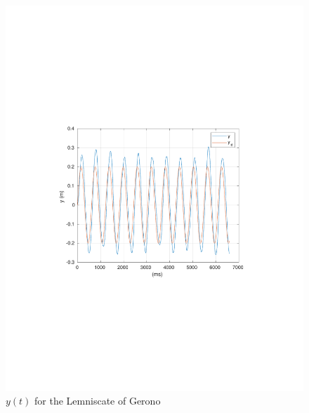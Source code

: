 \begin{frame} 
 \begin{figure}[!htb]
 	\centering
 	\includegraphics[scale=0.7,trim={3.5cm 8cm 4cm 8cm},clip]{figuras/CROB_Fuzzy_Gerono/y.pdf}
 	\caption{$y(t)$ for the Lemniscate of Gerono}
 	\label{fig:crob_lem_y}
 \end{figure} 
\end{frame}
